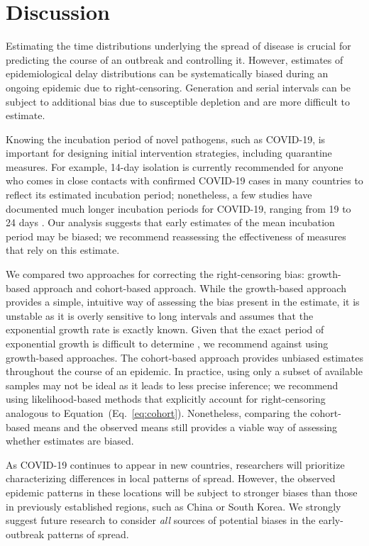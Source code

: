 \documentclass[12pt]{article}
\newcommand{\eref}[1]{(Eq.~\ref{eq:#1})}
\begin{document}

\section{Discussion}

Estimating the time distributions underlying the spread of disease is crucial for predicting the course of an outbreak and controlling it.
However, estimates of epidemiological delay distributions can be systematically biased during an ongoing epidemic due to right-censoring.
Generation and serial intervals can be subject to additional bias due to susceptible depletion and are more difficult to estimate.

Knowing the incubation period of novel pathogens, such as COVID-19, is important for designing initial intervention strategies, including quarantine measures.
For example, 14-day isolation is currently recommended for anyone who comes in close contacts with confirmed COVID-19 cases in many countries to reflect its estimated incubation period;
nonetheless, a few studies have documented much longer incubation periods for COVID-19, ranging from 19 to 24 days \citep{bai2020presumed, guan2020clinical}.
Our analysis suggests that early estimates of the mean incubation period may be biased;
we recommend reassessing the effectiveness of measures that rely on this estimate.

We compared two approaches for correcting the right-censoring bias: growth-based approach and cohort-based approach.
While the growth-based approach provides a simple, intuitive way of assessing the bias present in the estimate, it is unstable as it is overly sensitive to long intervals and assumes that the exponential growth rate is exactly known.
Given that the exact period of exponential growth is difficult to determine \citep{ma2014estimating}, we recommend against using growth-based approaches.
The cohort-based approach provides unbiased estimates throughout the course of an epidemic.
In practice, using only a subset of available samples may not be ideal as it leads to less precise inference;
we recommend using likelihood-based methods that explicitly account for right-censoring analogous to Equation~\eref{cohort}.
Nonetheless, comparing the cohort-based means and the observed means still provides a viable way of assessing whether estimates are biased.

As COVID-19 continues to appear in new countries, researchers will prioritize characterizing differences in local patterns of spread.
However, the observed epidemic patterns in these locations will be subject to stronger biases than those in previously established regions, such as China or South Korea.
We strongly suggest future research to consider \emph{all} sources of potential biases in the early-outbreak patterns of spread.


\end{document}
